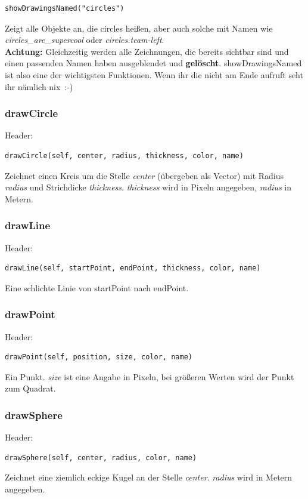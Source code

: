 \begin{verbatim}showDrawingsNamed("circles")
\end{verbatim}
Zeigt alle Objekte an, die \grqq circles\grqq{} heißen, aber auch solche mit Namen wie \textit{\grqq circles\_are\_supercool\grqq{}} oder \textit{\grqq circles.team-left\grqq{}}.\\
\textbf{Achtung:} Gleichzeitig werden alle Zeichnungen, die bereits sichtbar sind und einen passenden Namen haben ausgeblendet und \textbf{gelöscht}. showDrawingsNamed ist also eine der wichtigsten Funktionen. Wenn ihr die nicht am Ende aufruft seht ihr nämlich nix~:-) 

\subsubsection{drawCircle}
Header:

\begin{verbatim}drawCircle(self, center, radius, thickness, color, name)
\end{verbatim}
Zeichnet einen Kreis um die Stelle \textit{center} (übergeben als Vector) mit Radius \textit{radius} und Strichdicke \textit{thickness}. \textit{thickness} wird in Pixeln angegeben, \textit{radius} in Metern.

\subsubsection{drawLine}
Header:

\begin{verbatim}drawLine(self, startPoint, endPoint, thickness, color, name)
\end{verbatim}
Eine schlichte Linie von startPoint nach endPoint.

\subsubsection{drawPoint}
Header:

\begin{verbatim}drawPoint(self, position, size, color, name)
\end{verbatim}
Ein Punkt. \textit{size} ist eine Angabe in Pixeln, bei größeren Werten wird der Punkt zum Quadrat.

\subsubsection{drawSphere}
Header:

\begin{verbatim}drawSphere(self, center, radius, color, name)
\end{verbatim}
Zeichnet eine ziemlich eckige Kugel an der Stelle \textit{center}. \textit{radius} wird in Metern angegeben. 

